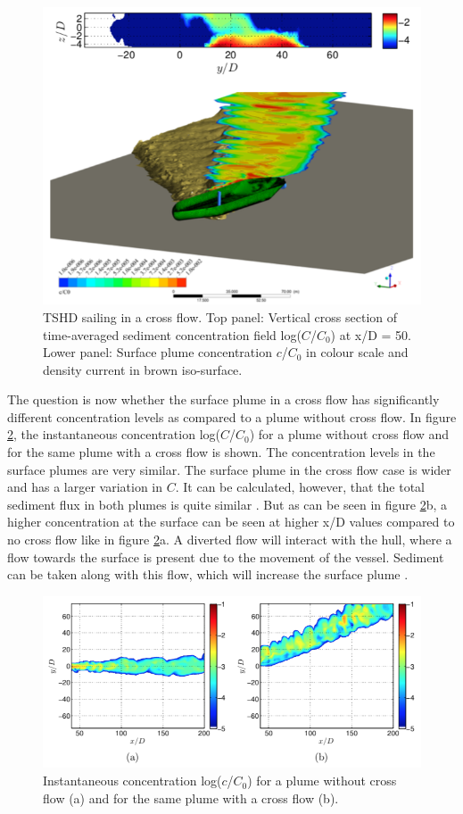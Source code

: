 \begin{figure}[ht!]
    \centering
    \includegraphics[width = .7\linewidth]{Images/Angle_TSHD2.png}
    \caption{TSHD sailing in a cross flow. Top panel: Vertical cross section of time-averaged sediment concentration field log($C$/$C_0$) at x/D = 50. Lower panel: Surface plume concentration $c$/$C_0$ in colour scale and density current in brown iso-surface.
}
    \label{fig:Angle_TSHD2}
\end{figure}

\noindent The question is now whether the surface plume in a cross flow has significantly different concentration levels as compared to a plume without cross flow. In figure \ref{fig:Angle_TSHD3}, the instantaneous concentration log($C$/$C_0$) for a plume without cross flow and for the same plume with a cross flow is shown. The concentration levels in the surface plumes are very similar. The surface plume in the cross flow case is wider and has a larger variation in $C$. It can be calculated, however, that the total sediment flux in both plumes is quite similar \citep{Decrop}. But as can be seen in figure \ref{fig:Angle_TSHD3}b, a higher concentration at the surface can be seen at higher x/D values compared to no cross flow like in figure \ref{fig:Angle_TSHD3}a. A diverted flow will interact with the hull, where a flow towards the surface is present due to the movement of the vessel. Sediment can be taken along with this flow, which will increase the surface plume \citep{Dewit}.


\begin{figure}[ht!]
    \centering
    \includegraphics[width = .75\linewidth]{Images/Angle_TSHD3.png}
    \caption{Instantaneous concentration log($c$/$C_0$) for a plume without cross flow (a) and for the same plume with a cross flow (b).
}
    \label{fig:Angle_TSHD3}
\end{figure}










